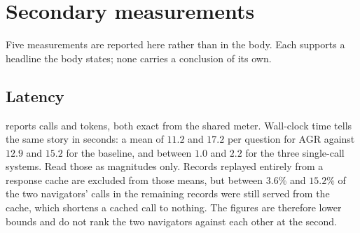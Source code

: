 %
%

\section{Secondary measurements}\label{app:measurements}

Five measurements are reported here rather than in the body. Each
supports a headline the body states; none carries a conclusion of its
own.

\subsection{Latency}\label{app:latency}

 reports calls and tokens, both exact from the shared
meter. Wall-clock time tells the same story in seconds: a mean of $11.2$
and $17.2$ per question for AGR against $12.9$ and $15.2$ for the
baseline, and between $1.0$ and $2.2$ for the three single-call systems.
Read those as magnitudes only. Records replayed entirely from a response
cache are excluded from those means, but between $3.6\%$ and $15.2\%$ of
the two navigators' calls in the remaining records were still served
from the cache, which shortens a cached call to nothing. The figures are
therefore lower bounds and do not rank the two navigators against each
other at the second.


